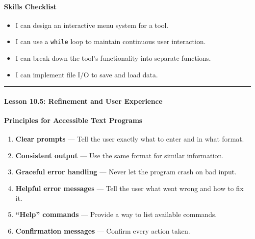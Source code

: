 \documentclass[
  justified,
  openright,
]{tufte-book}
\let\subsection\paragraph
\let\paragraph\paragraph
\let\subsection\paragraph
\let\paragraph\paragraph
\providecommand{\tightlist}{%
  \setlength{\itemsep}{0pt}\setlength{\parskip}{0pt}}
\begin{document}
\subsection{Skills Checklist}\label{skills-checklist-50}

\begin{itemize}
\tightlist
\item[$\square$]
  I can design an interactive menu system for a tool.
\item[$\square$]
  I can use a \texttt{while} loop to maintain continuous user
  interaction.
\item[$\square$]
  I can break down the tool's functionality into separate functions.
\item[$\square$]
  I can implement file I/O to save and load data.
\end{itemize}

\begin{center}\rule{0.5\linewidth}{0.5pt}\end{center}

\subsection{Lesson 10.5: Refinement and User
Experience}\label{lesson-10.5-refinement-and-user-experience}

\subsection{Principles for Accessible Text
Programs}\label{principles-for-accessible-text-programs}

\begin{enumerate}
\def\labelenumi{\arabic{enumi}.}
\tightlist
\item
  \textbf{Clear prompts} --- Tell the user exactly what to enter and in
  what format.
\item
  \textbf{Consistent output} --- Use the same format for similar
  information.
\item
  \textbf{Graceful error handling} --- Never let the program crash on
  bad input.
\item
  \textbf{Helpful error messages} --- Tell the user what went wrong and
  how to fix it.
\item
  \textbf{``Help'' commands} --- Provide a way to list available
  commands.
\item
  \textbf{Confirmation messages} --- Confirm every action taken.
\end{enumerate}
\end{document}
